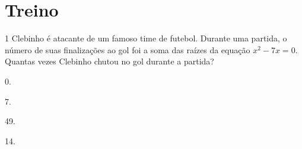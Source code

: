 {{





\section*{Treino}

\num{1} Clebinho é atacante de um famoso time de futebol. Durante uma
partida, o número de suas finalizações ao gol foi a soma das raízes da
equação $x^2- 7x = 0.$ Quantas vezes Clebinho chutou no gol durante a
partida?

\begin{escolha}[itemsep=0pt]
\item 0.
\item 7.
\item 49.
\item 14.
\end{escolha}

















}}
